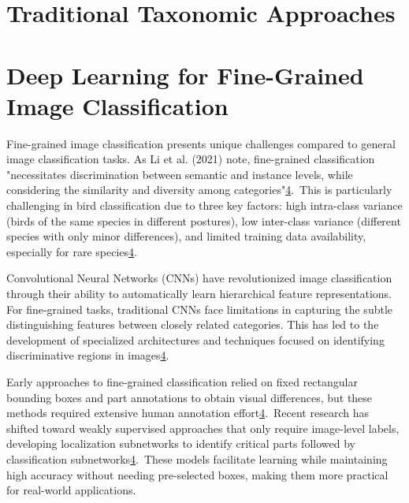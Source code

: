 \section*{Traditional Taxonomic Approaches}

\section*{Deep Learning for Fine-Grained Image Classification}
Fine-grained image classification presents unique challenges compared to general image classification tasks. As Li et al. (2021) note, fine-grained classification "necessitates discrimination between semantic and instance levels, while considering the similarity and diversity among categories"\href{https://www.frontiersin.org/journals/neurorobotics/articles/10.3389/fnbot.2024.1391791/full}{4}. This is particularly challenging in bird classification due to three key factors: high intra-class variance (birds of the same species in different postures), low inter-class variance (different species with only minor differences), and limited training data availability, especially for rare species\href{https://www.frontiersin.org/journals/neurorobotics/articles/10.3389/fnbot.2024.1391791/full}{4}.

Convolutional Neural Networks (CNNs) have revolutionized image classification through their ability to automatically learn hierarchical feature representations. For fine-grained tasks, traditional CNNs face limitations in capturing the subtle distinguishing features between closely related categories. This has led to the development of specialized architectures and techniques focused on identifying discriminative regions in images\href{https://www.frontiersin.org/journals/neurorobotics/articles/10.3389/fnbot.2024.1391791/full}{4}.

Early approaches to fine-grained classification relied on fixed rectangular bounding boxes and part annotations to obtain visual differences, but these methods required extensive human annotation effort\href{https://www.frontiersin.org/journals/neurorobotics/articles/10.3389/fnbot.2024.1391791/full}{4}. Recent research has shifted toward weakly supervised approaches that only require image-level labels, developing localization subnetworks to identify critical parts followed by classification subnetworks\href{https://www.frontiersin.org/journals/neurorobotics/articles/10.3389/fnbot.2024.1391791/full}{4}. These models facilitate learning while maintaining high accuracy without needing pre-selected boxes, making them more practical for real-world applications.

